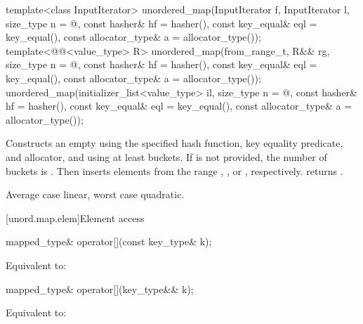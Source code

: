 %
\begin{itemdecl}
template<class InputIterator>
  unordered_map(InputIterator f, InputIterator l,
                size_type n = @\seebelow@,
                const hasher& hf = hasher(),
                const key_equal& eql = key_equal(),
                const allocator_type& a = allocator_type());
template<@@<value_type> R>
  unordered_map(from_range_t, R&& rg,
                size_type n = @\seebelow@,
                const hasher& hf = hasher(),
                const key_equal& eql = key_equal(),
                const allocator_type& a = allocator_type());
unordered_map(initializer_list<value_type> il,
              size_type n = @\seebelow@,
              const hasher& hf = hasher(),
              const key_equal& eql = key_equal(),
              const allocator_type& a = allocator_type());
\end{itemdecl}

\begin{itemdescr}
\pnum
\effects
Constructs an empty  using the
specified hash function, key equality predicate, and allocator, and
using at least  buckets. If  is not
provided, the number of buckets is . Then
inserts elements from the range , , or ,
respectively.
 returns .

\pnum
\complexity
Average case linear, worst case quadratic.
\end{itemdescr}

[unord.map.elem]{Element access}

%
%
\begin{itemdecl}
mapped_type& operator[](const key_type& k);
\end{itemdecl}

\begin{itemdescr}
\pnum
\effects
Equivalent to: 
\end{itemdescr}

%
%
\begin{itemdecl}
mapped_type& operator[](key_type&& k);
\end{itemdecl}

\begin{itemdescr}
\pnum
\effects
Equivalent to: 
\end{itemdescr}

